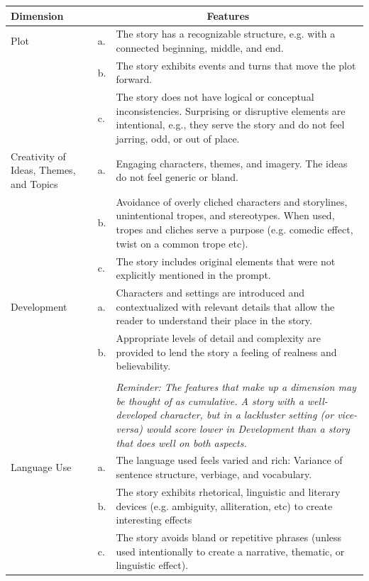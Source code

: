 \documentclass{article}
\begin{document}
\begin{tabular}{|p{3cm}|@{~~}l@{~~}p{10cm}|} \hline
\textbf{Dimension} &  \multicolumn{2}{c}{\textbf{Features}}\\\hline
Plot & a. & The story has a recognizable structure, e.g. with a connected beginning, middle, and end.
\\
& b. & The story exhibits events and turns that move the plot forward. \\
& c. & The story does not have logical or conceptual inconsistencies. Surprising or disruptive elements are intentional, e.g., they serve the story and do not feel jarring, odd, or out of place.\\\hline
Creativity of Ideas, Themes, and Topics & 
a. & Engaging characters, themes, and imagery. The ideas do not feel generic or bland. \\
& b. & Avoidance of overly cliched characters and storylines, unintentional tropes, and stereotypes. When used, tropes and cliches serve a purpose (e.g. comedic effect, twist on a common trope etc). 
\\
& c. &The story includes original elements that were not explicitly mentioned in the prompt.\\\hline
Development & 
a. &Characters and settings are introduced and contextualized with relevant details that allow the reader to understand their place in the story.\\
& b. & Appropriate levels of detail and complexity are provided to lend the story a feeling of realness and believability.\\ 
& & \\
&  & \emph{Reminder: The features that make up a dimension may be thought of as cumulative. A story with a well-developed character, but in a lackluster setting (or vice-versa) would score lower in Development than a story that does well on both aspects.} \\\hline
Language Use & 
a. & The language used feels varied and rich: Variance of sentence structure, verbiage, and vocabulary. 
\\
& b. & The story exhibits rhetorical, linguistic and literary devices (e.g. ambiguity, alliteration, etc) to create interesting effects\\
& c. & The story avoids bland or repetitive phrases (unless used intentionally to create a narrative, thematic, or linguistic effect). 
\\\hline
\end{tabular}
\end{document}
